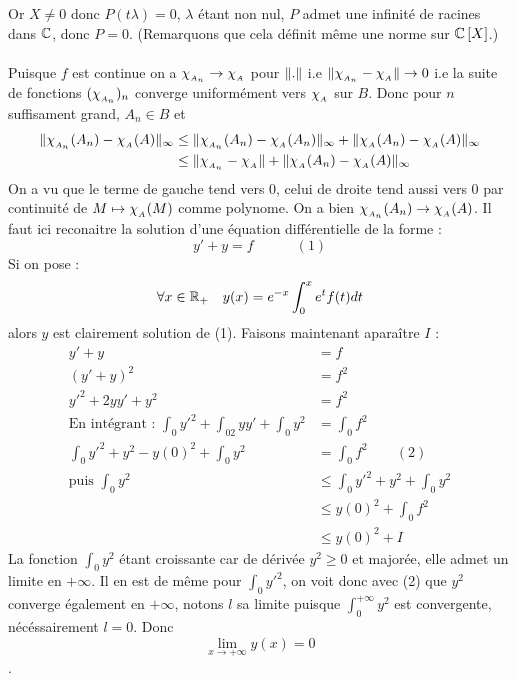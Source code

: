 \documentclass[letterpaper,10pt]{article}
\begin{document}
{Or $X \neq 0$ donc $P(t\lambda) =0$, $\lambda$ étant non nul, $P$ admet une infinité de racines dans $\mathbb{C}$, donc $P=0$. (Remarquons que cela définit même une norme sur $\mathbb{C}\left[X\right] $.)\\
\\
Puisque $f$ est continue on a $\chi_{_{A_n}} \to \chi_{_{A}}$ pour $\|.\|$ i.e $\|\chi_{_{A_n}}-\chi_{_{A}}\| \to 0$ i.e la suite de fonctions $(\chi_{_{A_n}})_n$ converge uniformément vers $\chi_{_{A}}$ sur $B$. Donc pour $n$ suffisament grand, $A_n\in B $ et \begin{align*}\|\chi_{_{A_n}}(A_n)-\chi_{_{A}}(A)\|_{\infty} &\leq \|\chi_{_{A_n}}(A_n)-\chi_{_{A}}(A_n)\|_{\infty} + \|\chi_{_{A}}(A_n)-\chi_{_{A}}(A)\|_{\infty}\\ &\leq \|\chi_{_{A_n}}-\chi_{_{A}}\| + \|\chi_{_{A}}(A_n)-\chi_{_{A}}(A)\|_{\infty} \end{align*}
On a vu que le terme de gauche tend vers 0, celui de droite tend aussi vers 0 par continuité de $M\mapsto \chi_{_{A}}(M)$ comme polynome.
On a bien $\chi_{_{A_n}}(A_n) \to \chi_{_{A}}(A)$. 
}
{
Il faut ici reconaitre la solution d'une équation différentielle de la forme : \[ y' + y = f \quad\quad\quad (1)\] Si on pose : \[\forall x \in \mathbb{R}_+ \quad y(x) = e^{-x}\int_0^xe^tf(t)dt \] alors $y$ est clairement solution de  (1). Faisons maintenant aparaître $I$ : \begin{align*}
y'+y &= f \\
(y'+y)^2 &= f^2\\ 
y'^2 + 2yy' + y^2 &= f^2 \\
\text{En intégrant : } \int_0y'^2 + \int_02yy' +\int_0y^2 &= \int_0 f^2\\
\int_0y'^2 + y^2-y(0)^2 + \int_0 y^2 &= \int_0f^2 \quad\quad (2)\\ \text{puis } \int_0 y^2 &\leq \int_0 y'^2 + y^2 + \int_0 y^2\\
&\leq y(0)^2 + \int_0 f^2\\ &\leq y(0)^2 +I
\end{align*}
La fonction $\int_0y^2$ étant croissante car de dérivée $y^2 \geq 0$ et majorée, elle admet un limite en $+\infty$. Il en est de même pour $\int_0y'^2$, on voit donc avec (2) que $y^2$
 converge également en $+\infty$, notons $l$ sa limite puisque $\int_0^{+\infty}y^2$ est convergente, nécéssairement $l=0$. Donc \[ \lim_{x\to+\infty}y(x) =0\].
}
\end{document}
